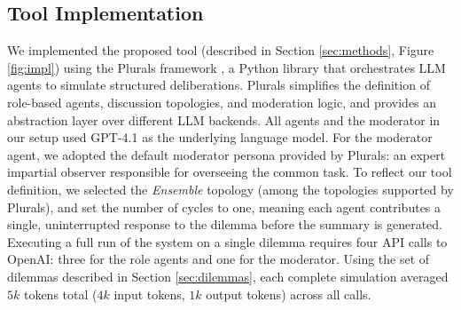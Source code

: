 \subsection{Tool Implementation}

We implemented the proposed tool (described in Section \ref{sec:methods}, Figure \ref{fig:impl}) using the Plurals framework \cite{ashkinaze2025pluralsguidingllmssimulated}, a Python library that orchestrates LLM agents to simulate structured deliberations.
Plurals simplifies the definition of role-based agents, discussion topologies, and moderation logic, and provides an abstraction layer over different LLM backends.
All agents and the moderator in our setup used GPT-4.1 as the underlying language model.
For the moderator agent, we adopted the default moderator persona provided by Plurals: an expert impartial observer responsible for overseeing the common task.
To reflect our tool definition, we selected the \textit{Ensemble} topology (among the topologies supported by Plurals), and set the number of cycles to one, meaning each agent contributes a single, uninterrupted response to the dilemma before the summary is generated.
Executing a full run of the system on a single dilemma requires four API calls to OpenAI: three for the role agents and one for the moderator. Using the set of dilemmas described in Section \ref{sec:dilemmas}, each complete simulation averaged $5k$ tokens total ($4k$ input tokens, $1k$ output tokens) across all calls.
